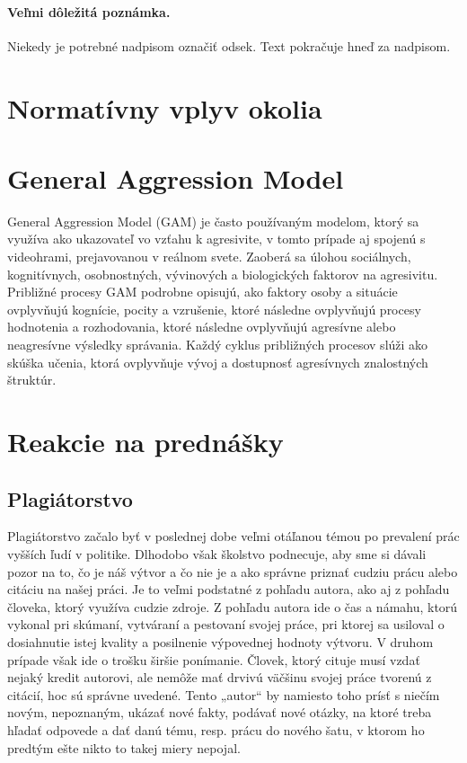 \documentclass[10pt,twoside,slovak,a4paper]{article}
\begin{document}
\paragraph{Veľmi dôležitá poznámka.}
Niekedy je potrebné nadpisom označiť odsek. Text pokračuje hneď za nadpisom.


\section{Normatívny vplyv okolia} \label{normat}



\section{General Aggression Model} \label{GAM}
General Aggression Model (GAM) je často používaným modelom, ktorý sa využíva ako ukazovateľ vo vzťahu k agresivite, v tomto prípade aj spojenú s videohrami, prejavovanou v reálnom svete. Zaoberá sa úlohou sociálnych, kognitívnych, osobnostných, vývinových a biologických faktorov na agresivitu. Približné procesy GAM podrobne opisujú, ako faktory osoby a situácie ovplyvňujú kognície, pocity a vzrušenie, ktoré následne ovplyvňujú procesy hodnotenia a rozhodovania, ktoré následne ovplyvňujú agresívne alebo neagresívne výsledky správania. Každý cyklus približných procesov slúži ako skúška učenia, ktorá ovplyvňuje vývoj a dostupnosť agresívnych znalostných štruktúr\cite{GAM}. 

\section{Reakcie na prednášky} \label{reakcie}

\subsection{Plagiátorstvo} \label{ina:plagiatorstvo}
Plagiátorstvo začalo byť v poslednej dobe veľmi otáľanou témou po prevalení prác vyšších ľudí v politike. Dlhodobo však školstvo podnecuje, aby sme si dávali pozor na to, čo je náš výtvor a čo nie je a ako správne priznať cudziu prácu alebo citáciu na našej práci. Je to veľmi podstatné z pohľadu autora, ako aj z pohľadu človeka, ktorý využíva cudzie zdroje. 
Z pohľadu autora ide o čas a námahu, ktorú vykonal pri skúmaní, vytváraní a pestovaní svojej práce, pri ktorej sa usiloval o dosiahnutie istej kvality a posilnenie výpovednej hodnoty výtvoru. V druhom prípade však ide o trošku širšie ponímanie. Človek, ktorý cituje musí vzdať nejaký kredit autorovi, ale nemôže mať drvivú väčšinu svojej práce tvorenú z citácií, hoc sú správne uvedené. Tento „autor“ by namiesto toho prísť s niečím novým, nepoznaným, ukázať nové fakty, podávať nové otázky, na ktoré treba hľadať odpovede a dať danú tému, resp. prácu do nového šatu, v ktorom ho predtým ešte nikto to takej miery nepojal. 
\end{document}
